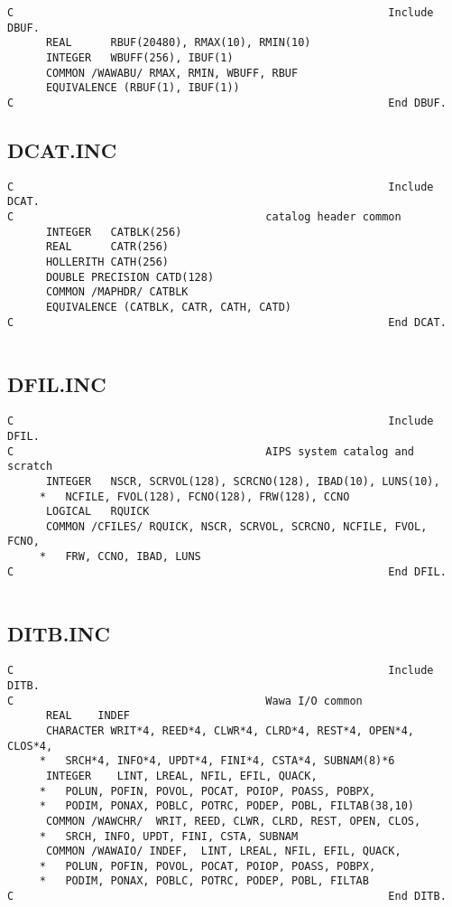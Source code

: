 \begin{verbatim}
C                                                          Include DBUF.
      REAL      RBUF(20480), RMAX(10), RMIN(10)
      INTEGER   WBUFF(256), IBUF(1)
      COMMON /WAWABU/ RMAX, RMIN, WBUFF, RBUF
      EQUIVALENCE (RBUF(1), IBUF(1))
C                                                          End DBUF.

\end{verbatim}
\subsection{DCAT.INC}

\begin{verbatim}
C                                                          Include DCAT.
C                                       catalog header common
      INTEGER   CATBLK(256)
      REAL      CATR(256)
      HOLLERITH CATH(256)
      DOUBLE PRECISION CATD(128)
      COMMON /MAPHDR/ CATBLK
      EQUIVALENCE (CATBLK, CATR, CATH, CATD)
C                                                          End DCAT.


\end{verbatim}
\subsection{DFIL.INC}

\begin{verbatim}
C                                                          Include DFIL.
C                                       AIPS system catalog and scratch
      INTEGER   NSCR, SCRVOL(128), SCRCNO(128), IBAD(10), LUNS(10),
     *   NCFILE, FVOL(128), FCNO(128), FRW(128), CCNO
      LOGICAL   RQUICK
      COMMON /CFILES/ RQUICK, NSCR, SCRVOL, SCRCNO, NCFILE, FVOL, FCNO,
     *   FRW, CCNO, IBAD, LUNS
C                                                          End DFIL.


\end{verbatim}
\subsection{DITB.INC}

\begin{verbatim}
C                                                          Include DITB.
C                                       Wawa I/O common
      REAL    INDEF
      CHARACTER WRIT*4, REED*4, CLWR*4, CLRD*4, REST*4, OPEN*4, CLOS*4,
     *   SRCH*4, INFO*4, UPDT*4, FINI*4, CSTA*4, SUBNAM(8)*6
      INTEGER    LINT, LREAL, NFIL, EFIL, QUACK,
     *   POLUN, POFIN, POVOL, POCAT, POIOP, POASS, POBPX,
     *   PODIM, PONAX, POBLC, POTRC, PODEP, POBL, FILTAB(38,10)
      COMMON /WAWCHR/  WRIT, REED, CLWR, CLRD, REST, OPEN, CLOS,
     *   SRCH, INFO, UPDT, FINI, CSTA, SUBNAM
      COMMON /WAWAIO/ INDEF,  LINT, LREAL, NFIL, EFIL, QUACK,
     *   POLUN, POFIN, POVOL, POCAT, POIOP, POASS, POBPX,
     *   PODIM, PONAX, POBLC, POTRC, PODEP, POBL, FILTAB
C                                                          End DITB.


\end{verbatim}

